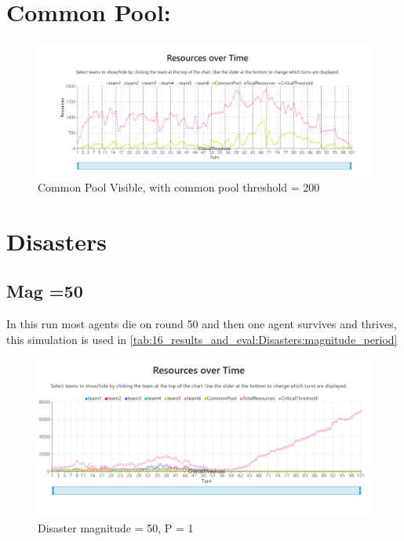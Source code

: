 \section{Common Pool:}
\begin{figure}[h]
    \centering
    \includegraphics[width=\linewidth]{21_appendix_simulation/images/CPVisible.png}
    \caption{Common Pool Visible, with common pool threshold = 200}
    \label{fig:AppendixSim:cpvisible}
\end{figure}

\section{Disasters}
\subsection{Mag =50}
In this run most agents die on round 50 and then one agent survives and thrives, this simulation is used in \ref{tab:16_results_and_eval:Disasters:magnitude_period}
\begin{figure}[!htb]
    \centering
    \includegraphics[width=\linewidth]{21_appendix_simulation/images/Mag=50.png}
    \caption{Disaster magnitude = 50, P = 1}
    \label{fig:AppendixSim:Disaster_mag50}
\end{figure}

